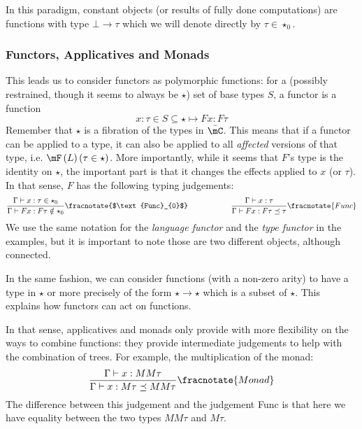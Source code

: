 \documentclass[math, english, info]{cours}
\begin{document}
In this paradigm, constant objects (or results of fully done computations) are functions with type $\bot \to \tau$ which we will denote directly by $\tau \in \star_{0}$.

\subsubsection{Functors, Applicatives and Monads}
This leads us to consider functors as polymorphic functions: for a (possibly restrained, though it seems to always be $\star$) set of base types $S$, a functor is a function
\begin{equation*}
	x: \tau\in S\subseteq \star \mapsto F x: F\tau
\end{equation*}
Remember that $\star$ is a fibration of the types in $\bar{\mC}$.
This means that if a functor can be applied to a type, it can also be applied to all \emph{affected} versions of that type, i.e. $\mF\left( L \right)(\tau\in \star)$.
More importantly, while it seems that $F$'s type is the identity on $\star$, the important part is that it changes the effects applied to $x$ (or $\tau$).
In that sense, $F$ has the following typing judgements:
\begin{equation*}
	\frac{\Gamma\vdash x: \tau \in \star_{0}}{\Gamma\vdash F x: F\tau \notin \star_{0}}\fracnotate{$\text{Func}_{0}$} \hspace{2cm} \frac{\Gamma\vdash x: \tau}{\Gamma\vdash Fx : F\tau\preceq \tau}\fracnotate{Func}
\end{equation*}
We use the same notation for the \emph{language functor} and the \emph{type functor} in the examples, but it is important to note those are two different objects, although connected.

In the same fashion, we can consider functions (with a non-zero arity) to have a type in $\star$ or more precisely of the form $\star \to \star$ which is a subset of $\star$.
This explains how functors can act on functions.

In that sense, applicatives and monads only provide with more flexibility on the ways to combine functions:
they provide intermediate judgements to help with the combination of trees. For example, the multiplication of the monad:
\begin{equation*}
	\frac{\Gamma\vdash x: MM\tau}{\Gamma\vdash x: M\tau \preceq MM\tau}\fracnotate{Monad}
\end{equation*}
The difference between this judgement and the judgement Func is that here we have equality between the two types $MM\tau$ and $M\tau$.
\end{document}
